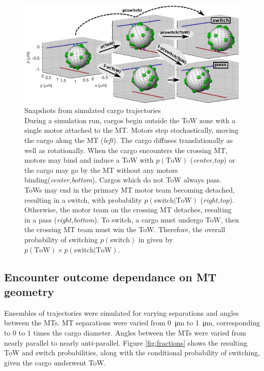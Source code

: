 \begin{figure}
\centering
\includegraphics[width=6.5in]{appendix1/snapshots}
\caption[Snapshots from simulated cargo trajectories]{Snapshots from simulated cargo trajectories\\
During a simulation run, cargos begin outside the ToW zone with a single motor attached to the MT. Motors step stochastically, moving the cargo along the MT (\textit{left}). The cargo diffuses translationally as well as rotationally. When the cargo encounters the crossing MT, motors may bind and induce a ToW with $p(\text{ToW})$ (\textit{center,top}) or the cargo may go by the MT without any motors binding(\textit{center,bottom}). Cargos which do not ToW always pass. ToWs may end in the primary MT motor team becoming detached, resulting in a switch, with probability $p(\text{switch|ToW})$ (\textit{right,top}). Otherwise, the motor team on the crossing MT detaches, resulting in a pass (\textit{right,bottom}). To switch, a cargo must undergo ToW, then the crossing MT team must win the ToW. Therefore, the overall probability of switching $p(\text{switch})$ in given by $p(\text{ToW}) \times p(\text{switch|ToW})$.}
\label{fig:trajectories}
\end{figure}

\subsection{Encounter outcome dependance on MT geometry}

Ensembles of trajectories were simulated for varying separations and angles between the MTs. MT separations were varied from \SI{0}{\micro\meter} to \SI{1}{\micro\meter}, corresponding to 0 to 1 times the cargo diameter. Angles between the MTs were varied from nearly parallel to nearly anti-parallel. Figure \ref{fig:fractions} shows the resulting ToW and switch probabilities, along with the conditional probability of switching, given the cargo underwent ToW.

